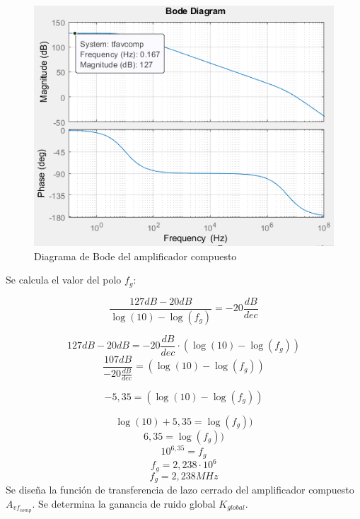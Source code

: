 \begin{figure}[!h]
    \centering
    \includegraphics[scale=0.7]{Imagenes/Av_comp.png}
    \caption{Diagrama de Bode del amplificador compuesto}
\end{figure}

\bigskip

\hspace{1mm} Se calcula el valor del polo \(f_g\):

\begin{equation}
    \frac{127dB - 20 dB}{\log(10) - \log(f_g)}= -20\frac{dB}{dec}
\end{equation}

\begin{equation}
    127dB - 20 dB= -20\frac{dB}{dec} \cdot (\log(10) - \log(f_g))
\end{equation}
\begin{equation}
    \frac{107dB}{-20\frac{dB}{dec} }= (\log(10) - \log(f_g))
\end{equation}

\begin{equation}
    -5,35 = (\log(10) - \log(f_g))
\end{equation}

\begin{equation}
    \log(10)+5,35 = \log(f_g))
\end{equation}
\begin{equation}
    6,35 = \log(f_g))
\end{equation}
\begin{equation}
    10^{6,35} = f_g
\end{equation}
\begin{equation}
    f_g =2,238\cdot10^6
\end{equation}
\begin{equation}
    \boxed{
        f_g =2,238MHz
    }
\end{equation}
\hspace{1mm} Se diseña la función de transferencia de lazo cerrado del amplificador compuesto \(A_{vf_{comp}}\). Se determina la ganancia de ruido global \(K_{global}\).

